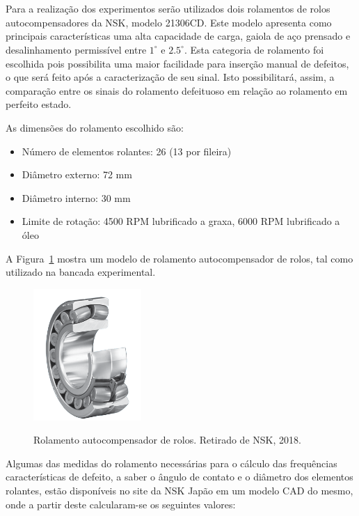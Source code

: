 \documentclass[
	12pt,				
	oneside,			
	a4paper,			
	english,			
	brazil,			
	]{abntex2ppgsi}
\begin{document}
\section{}

Para a realização dos experimentos serão utilizados dois rolamentos de rolos autocompensadores da NSK, modelo 21306CD. Este modelo apresenta como principais características uma alta capacidade de carga, gaiola de aço prensado e desalinhamento permissível entre $1^{\circ}$ e $2.5^{\circ}$. Esta categoria de rolamento foi escolhida pois possibilita uma maior facilidade para inserção manual de defeitos, o que será feito após a caracterização de seu sinal. Isto possibilitará, assim, a comparação entre os sinais do rolamento defeituoso em relação ao rolamento em perfeito estado. 

As dimensões do rolamento escolhido são:

\begin{itemize}
	\item Número de elementos rolantes: 26 (13 por fileira)
	\item Diâmetro externo: 72 \si{\mm}
	\item Diâmetro interno: 30 \si{\mm}
	\item Limite de rotação: 4500 RPM lubrificado a graxa, 6000 RPM lubrificado a óleo
\end{itemize}

A Figura~\ref{Figura24} mostra um modelo de rolamento autocompensador de rolos, tal como utilizado na bancada experimental.

\begin{figure}[H]
\centering
\caption {Rolamento autocompensador de rolos. Retirado de NSK, 2018.}
\includegraphics[width=\textwidth,height=50mm,keepaspectratio]{Figura24}
\label{Figura24}
\end{figure} 

Algumas das medidas do rolamento necessárias para o cálculo das frequências características de defeito, a saber o ângulo de contato e o diâmetro dos elementos rolantes, estão disponíveis no site da NSK Japão em um modelo CAD do mesmo, onde a partir deste calcularam-se os seguintes valores:
\end{document}
